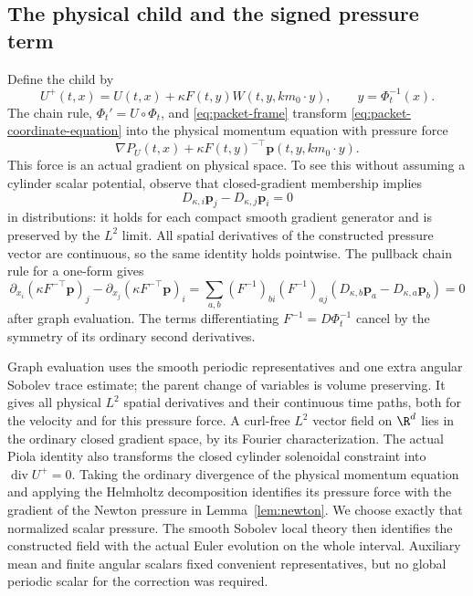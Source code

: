 \subsection{The physical child and the signed pressure term}
Define the child by
\begin{equation}\label{eq:packet-exact-child}
 U^+(t,x)=U(t,x)+\kappa F(t,y)
          W(t,y,km_0\cdot y),\qquad y=\Phi_t^{-1}(x).
\end{equation}
The chain rule, $\Phi_t'=U\circ\Phi_t$, and
\eqref{eq:packet-frame} transform
\eqref{eq:packet-coordinate-equation} into the physical momentum equation
with pressure force
\[
 \nabla P_U(t,x)+\kappa F(t,y)^{-\top}
             \mathbf p(t,y,km_0\cdot y).
\]
This force is an actual gradient on physical space. To see this without
assuming a cylinder scalar potential, observe that closed-gradient
membership implies
\[
 D_{\kappa,i}\mathbf p_j-D_{\kappa,j}\mathbf p_i=0
\]
in distributions: it holds for each compact smooth gradient generator
and is preserved by the $L^2$ limit. All spatial derivatives of the
constructed pressure vector are continuous, so the same identity holds
pointwise. The pullback chain rule for a one-form gives
\[
 \partial_{x_i}(\kappa F^{-\top}\mathbf p)_j
 -\partial_{x_j}(\kappa F^{-\top}\mathbf p)_i
 =\sum_{a,b}(F^{-1})_{bi}(F^{-1})_{aj}
       (D_{\kappa,b}\mathbf p_a-D_{\kappa,a}\mathbf p_b)=0
\]
after graph evaluation. The terms differentiating $F^{-1}=D\Phi_t^{-1}$
cancel by the symmetry of its ordinary second derivatives.

Graph evaluation uses the smooth periodic representatives and one extra
angular Sobolev trace estimate; the parent change of variables is volume
preserving. It gives all physical $L^2$ spatial derivatives and their
continuous time paths, both for the velocity and for this pressure force.
A curl-free $L^2$ vector field on $\R^d$ lies in the ordinary closed
gradient space, by its Fourier characterization. The actual Piola
identity also transforms the closed cylinder solenoidal constraint into
$\operatorname{div}U^+=0$. Taking the ordinary divergence of the physical
momentum equation and applying the Helmholtz decomposition identifies
its pressure force with the gradient of the Newton pressure in
Lemma~\ref{lem:newton}. We choose exactly that normalized scalar pressure.
The smooth Sobolev local theory then identifies the constructed field
with the actual Euler evolution on the whole interval. Auxiliary mean
and finite angular scalars fixed convenient representatives, but no
global periodic scalar for the correction was required.

